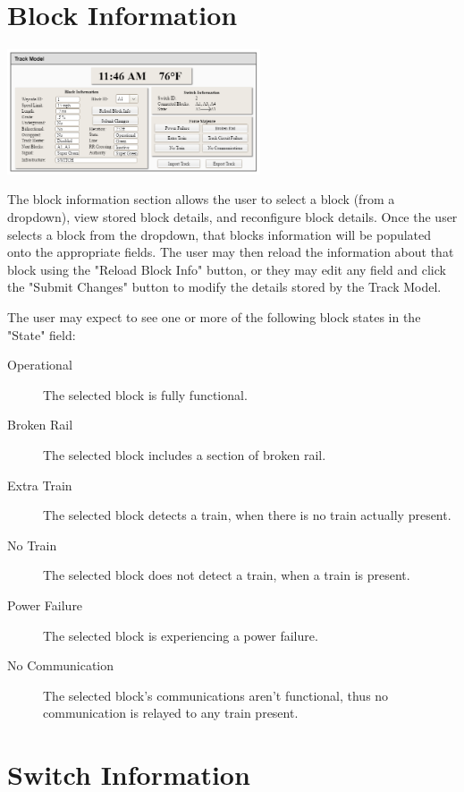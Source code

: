 \documentclass{scrreprt}
\begin{document}
\section{Block Information}

\begin{center}
    \includegraphics[trim={.5cm .5cm 11cm 3.6cm},clip,width=7.5cm]{track-model}
\end{center}

The block information section allows the user to select a block (from a dropdown), view
stored block details, and reconfigure block details. Once the user selects a block from the
dropdown, that blocks information will be populated onto the appropriate fields. The user may
then reload the information about that block using the "Reload Block Info" button, or they
may edit any field and click the "Submit Changes" button to modify the details stored by
the Track Model.

The user may expect to see one or more of the following block states in the "State" field:
\begin{description}
    \item[Operational] The selected block is fully functional.
    \item[Broken Rail] The selected block includes a section of broken rail.
    \item[Extra Train] The selected block detects a train, when there is no train
        actually present.
    \item[No Train] The selected block does not detect a train, when a train is present.
    \item[Power Failure] The selected block is experiencing a power failure.
    \item[No Communication] The selected block's communications aren't functional, thus no
        communication is relayed to any train present.
\end{description}

\section{Switch Information}
\end{document}
